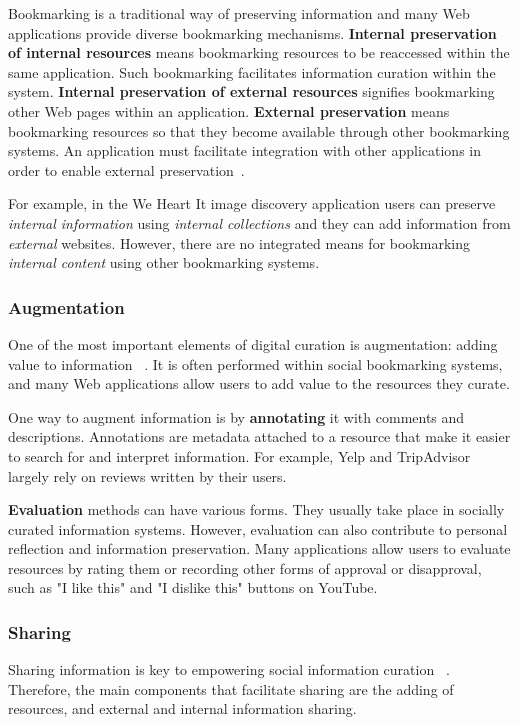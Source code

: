 \documentclass{sigchi}
\begin{document}
{{{Bookmarking is a traditional way of preserving information and many Web applications provide diverse bookmarking mechanisms. \textbf{Internal preservation of internal resources} means bookmarking resources to be reaccessed within the same application. Such bookmarking facilitates information curation within the system. \textbf{Internal preservation of external resources} signifies bookmarking other Web pages within an application. \textbf{External preservation} means bookmarking resources so that they become available through other bookmarking systems. An application must facilitate integration with other applications in order to enable external preservation~\cite{abrams1998information}.

For example, in the We Heart It image discovery application users can preserve \textit{internal  information} using \textit{internal collections} and they can add information from \textit{external} websites. However, there are no integrated means for bookmarking \textit{internal content} using other bookmarking systems.  
} %

{\subsubsection{Augmentation}
One of the most important elements of digital curation is augmentation: adding value to information ~\cite{beagrie2008digital,whittaker2011personal}. It is often performed within social bookmarking systems, and many Web applications allow users to add value to the resources they curate. 

One way to augment information is by \textbf{annotating} it with comments and descriptions. Annotations are metadata attached to a resource that make it easier to search for and interpret information. For example, Yelp and TripAdvisor largely rely on reviews written by their users. 

\textbf{Evaluation} methods can have various forms. They usually take place in socially curated information systems. However, evaluation can also contribute to personal reflection and information preservation. Many applications allow users to evaluate resources by rating them or recording other forms of approval or disapproval, such as "I like this" and "I dislike this" buttons on YouTube.
} %

{\subsubsection{Sharing}
Sharing information is key to empowering social information curation ~\cite{beagrie2008digital}. Therefore, the main components that facilitate sharing are the adding of resources, and external and internal information sharing.

}}}
\end{document}
